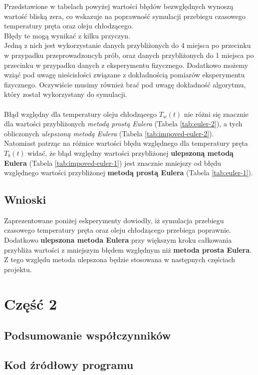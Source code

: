 \documentclass[
	12pt, %
]{fphw}
\begin{document}
Przedstawione w tabelach powyżej wartości błędów bezwględnych wynoszą wartość bliską zera,
co wskazuje na poprawność symulacji przebiegu czasowego temperatury pręta oraz oleju chłodzącego. \\
Błędy te mogą wynikać z kilku przyczyn. \\
Jedną z nich jest wykorzystanie danych przybliżonych do 4 miejsca po przecinku w przypadku przeprowadzoncyh
prób, oraz danych przybliżonych do 1 miejsca po przecinku w przypadku danych z eksperymentu fizycznego.
Dodatkowo możemy wziąć pod uwagę nieścisłości związane z dokładnością pomiarów eksperymentu fizycznego.
Oczywiście musimy również brać pod uwagę dokładność algorytmu, który został wykorzystany do symulacji. \\
\\
Błąd względny dla temperatury oleju chłodzącego \(T_w(t)\) nie różni się znacznie dla wartości przybliżonych
\textit{metodą prostą Eulera} (Tabela \ref{tab:euler-2}), a tych obliczonych \textit{ulepszoną metodą Eulera}
(Tabela \ref{tab:impoved-euler-2}). \\
Natomiast patrząc na różnice wartości błędu względnego dla temperatury pręta \(T_b(t)\) widać,
że błąd względny wartości przybliżonej \textbf{ulepszoną metodą Eulera} (Tabela \ref{tab:impoved-euler-1}) jest znacznie mniejszy
od błędu względnego wartości przybliżonej \textbf{metodą prostą Eulera} (Tabela \ref{tab:euler-1}).
\subsection{Wnioski}

Zaprezentowane poniżej eskperymenty dowiodły, iż symulacja przebiegu czasowego temperatury pręta
oraz oleju chłodzącego przebiega poprawnie. \\
Dodatkowo \textbf{ulepszona metoda Eulera} przy większym kroku całkowania przybliża wartości
z mniejszym błędem względnym niż \textbf{metoda prosta Eulera}.
Z tego względu metoda ulepszona będzie stosowana w następnych częściach projektu.

\section{Część 2}
\subsection{Podsumowanie współczynników}
\subsection{Kod źródłowy programu}
\end{document}
